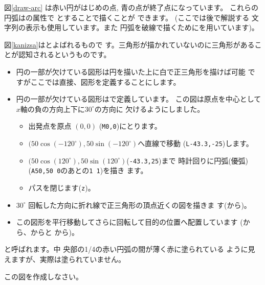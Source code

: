 図\ref{draw-arc}
は赤い円がはじめの点, 青の点が終了点になっています。
これらの円弧はの属性で
とすることで描くことが
できます。
{}
{\noexpand\newline\noexpand\small\noexpand\mdseries(ここでは後で解説する
文字列の表示も使用しています。また
円弧を破線で描くために\noexpand{}を用いています)。}

図\ref{kanizsa}はとよばれるもので
す。三角形が描かれていないのに三角形があることが認知されるというものです。
\begin{itemize}
 \item 円の一部が欠けている図形は円を描いた上に白で正三角形を描けば可能
       ですがここでは直接、図形を定義することにします。
 \item 円の一部が欠けている図形はで定義しています。
       この図は原点を中心として$x$軸の負の方向上下に$30^{\circ}$の方向に
       欠けるようにしました。
\begin{itemize}
 \item 出発点を原点 $(0,0)$ (\texttt{M0,0})にとります。
 \item $(50\cos(-120^{\circ}),50\sin(-120^{\circ})$へ直線で移動
       (\texttt{L-43.3,-25})します。
 \item $(50\cos(120^{\circ}),50\sin(120^{\circ})$(\texttt{-43.3,25})まで
       時計回りに円弧(優弧)(\texttt{A50,50 0}のあとの\texttt{1 1})を描き
       ます。
 \item パスを閉じます(\texttt{z})。
\end{itemize}
 \item $30^{\circ}$ 回転した方向に折れ線で正三角形の頂点近くの図を描きま
       す(から)。
 \item この図形を平行移動してさらに回転して目的の位置へ配置しています
  (から、からと
  から)。
\end{itemize}
{と呼ばれます。中
 央部の1/4の赤い円弧の間が薄く赤に塗られている
 ように見えますが、実際は塗られていません。\par
この図を作成しなさい。}
